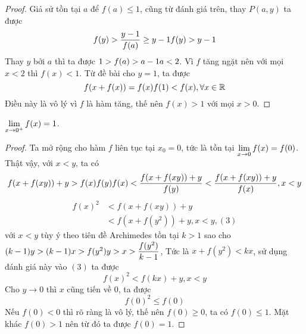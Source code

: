 \documentclass[11pt]{scrartcl}
\begin{document}
\begin{itemize}[label=, leftmargin=0em, itemsep=0.5em]
\begin{sol}
        \begin{proof}
            Giả sử tồn tại $a$ để $f(a) \leq 1$, cũng từ đánh giá trên, thay $P(a,y)$ ta được
        \[
            f(y) > \frac{y - 1}{f(a)} \geq y - 1 \lra f(y) > y - 1
        \]
        Thay $y$ bởi $a$ thì ta được $1 > f(a) > a - 1 \lra a < 2$. Vì $f$ tăng ngặt nên với mọi $x < 2$ thì $f(x) <1$. Từ đề bài cho $y = 1$, ta được
        \[
            f(x + f(x)) = f(x)f(1) < f(x), \forall x\in \mathbb{R}
        \]
        Điều này là vô lý vì $f$ là hàm tăng, thế nên $f(x) > 1$ với mọi $x > 0 $.
        \end{proof}

         $\displaystyle\lim_{x \to 0^+} f(x) = 1$.
        \begin{proof}
            Ta mở rộng cho hàm $f$ liên tục tại $x_0 = 0$, tức là tồn tại $\displaystyle\lim_{x \to 0}f(x) = f(0)$. Thật vậy, với $x < y$, ta có 
        \[
            f(x + f(xy)) + y > f(x)f(y) \lra f(x) < \frac{f(x + f(xy)) + y}{f(y)} < \frac{f(x + f(xy)) + y}{f(x)}, x < y
        \]
        \[
            \begin{aligned}
                f(x)^2 &< f(x + f(xy)) + y\\
                &< f(x + f(y^2)) + y, x < y, (3)
            \end{aligned}
        \]
        với $x < y$ tùy ý theo tiên đề Archimedes tồn tại $k > 1$ sao cho $(k - 1)y > (k - 1)x > f(y^2) \lra y  > x > \frac{f(y^2)}{k - 1}$, Tức là $x + f(y^2) < kx$, sử dụng đánh giá này vào $(3)$ ta được 
        \[
            f(x)^2 < f(kx) + y, x < y
        \]
        Cho $y \to 0$ thì $x$ cũng tiến về $0$, ta được 
        \[
            f(0)^2 \leq f(0) 
        \]
        Nếu $f(0) < 0$  thì rõ ràng là vô lý, thế nên $f(0) \geq 0$, ta có $f(0) \leq 1$. Mặt khác $f(0) > 1$ nên từ đó ta được $f(0) = 1$.
        \end{proof}
        


\end{sol}
\end{itemize}
\end{document}
